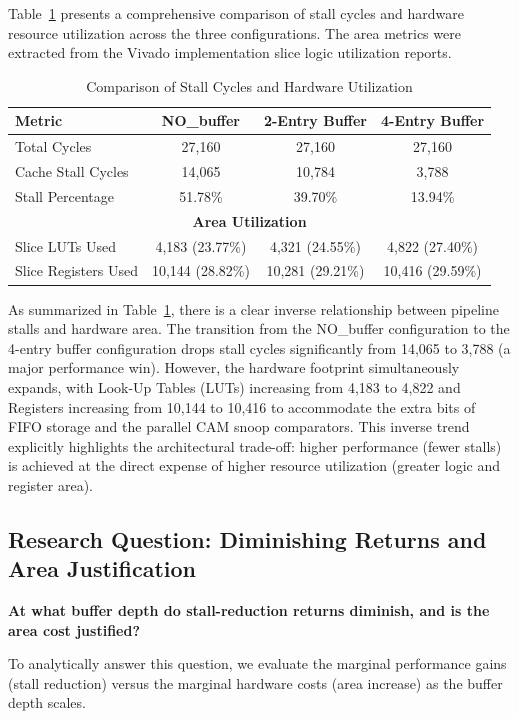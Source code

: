 \documentclass[conference]{IEEEtran}
\begin{document}
Table~\ref{tab:comparison} presents a comprehensive comparison of stall cycles and hardware resource utilization across the three configurations. The area metrics were extracted from the Vivado implementation slice logic utilization reports.

\begin{table}[H]
\centering
\caption{Comparison of Stall Cycles and Hardware Utilization}
\label{tab:comparison}
\begin{tabular}{@{}lccc@{}}
\toprule
\textbf{Metric} & \textbf{NO\_buffer} & \textbf{2-Entry Buffer} & \textbf{4-Entry Buffer} \\
\midrule
Total Cycles & 27,160 & 27,160 & 27,160 \\
Cache Stall Cycles & 14,065 & 10,784 & 3,788 \\
Stall Percentage & 51.78\% & 39.70\% & 13.94\% \\
\midrule
\multicolumn{4}{c}{\textbf{Area Utilization}} \\
\midrule
Slice LUTs Used & 4,183 (23.77\%) & 4,321 (24.55\%) & 4,822 (27.40\%) \\
Slice Registers Used & 10,144 (28.82\%) & 10,281 (29.21\%) & 10,416 (29.59\%) \\
\bottomrule
\end{tabular}
\end{table}

As summarized in Table~\ref{tab:comparison}, there is a clear inverse relationship between pipeline stalls and hardware area. The transition from the NO\_buffer configuration to the 4-entry buffer configuration drops stall cycles significantly from 14,065 to 3,788 (a major performance win). However, the hardware footprint simultaneously expands, with Look-Up Tables (LUTs) increasing from 4,183 to 4,822 and Registers increasing from 10,144 to 10,416 to accommodate the extra bits of FIFO storage and the parallel CAM snoop comparators. This inverse trend explicitly highlights the architectural trade-off: higher performance (fewer stalls) is achieved at the direct expense of higher resource utilization (greater logic and register area).

\subsection{Research Question: Diminishing Returns and Area Justification}
\textbf{At what buffer depth do stall-reduction returns diminish, and is the area cost justified?}

To analytically answer this question, we evaluate the marginal performance gains (stall reduction) versus the marginal hardware costs (area increase) as the buffer depth scales.
\end{document}
